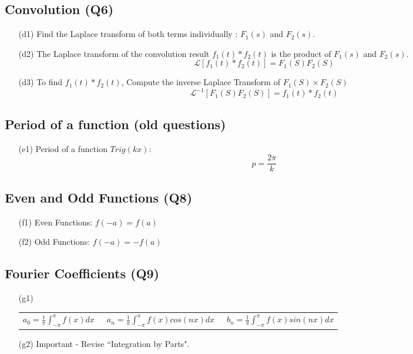 \documentclass[11pt,a4paper,titlepage,oneside,openany]{article}
\numberwithin{equation}{section}
\numberwithin{algorithm}{section}
\numberwithin{figure}{section}
\numberwithin{table}{section}
\begin{document}
\subsection*{Convolution (Q6)}
\begin{itemize}
\item[(d1)] Find the Laplace transform of both terms individually : $F_1(s)$ and $F_2(s)$.
\item[(d2)] The Laplace transform of the convolution result $f_1(t) \ast f_2(t)$ is the product of $F_1(s)$ and $F_2(s)$.
\[ \mathcal{L} [ f_1(t) \ast f_2(t) ] = F_1(S)F_2(S) \]
\item[(d3)] To find $f_1(t) \ast f_2(t)$, Compute the inverse Laplace Transform of $F_1(S)\times F_2(S)$
\[ \mathcal{L}^{-1}[ F_1(S)F_2(S)] = f_1(t) \ast f_2(t) \]
\end{itemize}

\subsection*{Period of a function (old questions)}
\begin{itemize}
\item[(e1)] Period of a function $Trig(kx)$:
\[ p =\frac{2\pi}{k} \]
\end{itemize}
\subsection*{Even and Odd Functions (Q8)}
\begin{itemize}
\item[(f1)] Even Functions: $f(-a) = f(a)$
\item[(f2)] Odd Functions: $f(-a) = -f(a)$
\end{itemize}

\subsection*{Fourier Coefficients (Q9)}
\begin{itemize}
\item[(g1)]

\begin{tabular}{lcr}

  $a_0 = \frac{1}{\pi}\int^{\pi }_{-\pi} f(x) dx$ & \mbox{     }$ a_n = \frac{1}{\pi}\int^{\pi }_{-\pi} f(x) cos(nx) dx $ & \mbox{     }$b_n = \frac{1}{\pi}\int^{\pi }_{-\pi} f(x) sin(nx) dx$ \\

\end{tabular}
\item[(g2)] Important - Revise ``Integration by Parts".
\end{itemize}
\newpage
\end{document}
